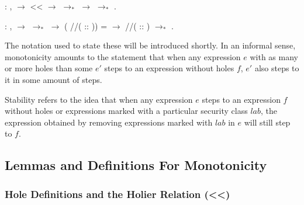 \documentclass[12pt]{report}
\begin{document}
\begin{coqdoccode}
\coqdocemptyline
\coqdocindent{1.00em}
  : \coqdockw{\ensuremath{\forall}}   ,\coqdoceol
\coqdocindent{2.00em}
  \ensuremath{\rightarrow}\coqdoceol
\coqdocindent{2.00em}
 <<  \ensuremath{\rightarrow}\coqdoceol
\coqdocindent{2.00em}
 $\to_*$  \ensuremath{\rightarrow}\coqdoceol
\coqdocindent{2.00em}
 $\to_*$ .\coqdoceol
\coqdocemptyline
\end{coqdoccode}

\begin{coqdoccode}
\coqdocemptyline
\coqdocindent{1.00em}
  : \coqdockw{\ensuremath{\forall}}   ,\coqdoceol
\coqdocindent{2.00em}
  \ensuremath{\rightarrow}\coqdoceol
\coqdocindent{2.00em}
 $\to_*$  \ensuremath{\rightarrow}\coqdoceol
\coqdocindent{2.00em}
(  //\coqdocvar{\_}( :: )) =  \ensuremath{\rightarrow}\coqdoceol
\coqdocindent{2.00em}
  //\coqdocvar{\_}( :: ) $\to_*$ .\coqdoceol
\coqdocemptyline
\end{coqdoccode}

The notation used to state these will be introduced shortly. In an
informal sense, monotonicity amounts to the statement that when any
expression $e$ with as many or more holes than some $e'$ steps to an
expression without holes $f$, $e'$ also steps to it in some amount of
steps.

Stability refers to the idea that when any expression $e$ steps to an
expression $f$ without holes or expressions marked with a particular
security class $lab$, the expression obtained by removing expressions
marked with $lab$ in $e$ will still step to $f$.

\subsection{Lemmas and Definitions For Monotonicity}


\subsubsection{Hole Definitions and the Holier Relation (<<)}
\end{document}
